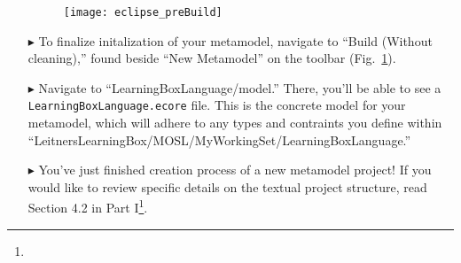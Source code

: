 \begin{itemize}
\vspace{0.5cm}

\begin{figure}[htbp]
	\centering
  \texttt{[image: eclipse\_preBuild]}
	\caption{}
	\label{fig:all_files}
\end{figure} 

\vspace{0.5cm}

\item[$\blacktriangleright$] To finalize initalization of your metamodel, navigate to ``Build (Without cleaning),'' found beside ``New Metamodel'' on the
toolbar (Fig.~\ref{fig:all_files}).

\item[$\blacktriangleright$] Navigate to ``LearningBoxLanguage/model.'' There, you'll be able to see a \texttt{LearningBoxLanguage.ecore} file. This is the
concrete model for your metamodel, which will adhere to any types and contraints you define within
``LeitnersLearningBox/MOSL/MyWorkingSet/LearningBoxLanguage.''

\item[$\blacktriangleright$] You've just finished creation process of a new metamodel project! If you would like to review specific details on the textual 
project structure, read Section 4.2 in Part I\footnote{\downLink}.


\end{itemize}
